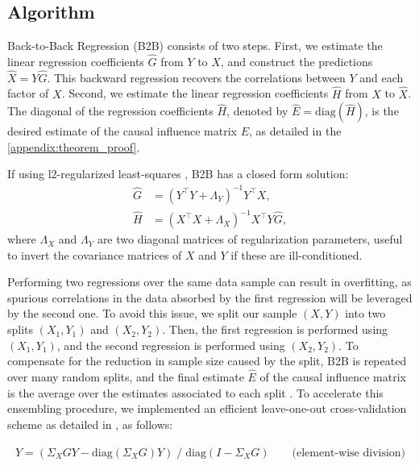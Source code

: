 \documentclass{article}
\begin{document}
\subsection{Algorithm}


Back-to-Back Regression (B2B) consists of two steps.
%
First, we estimate the linear regression coefficients $\hat G$ from $Y$ to $X$, and construct the predictions $\hat X = Y \hat G$.
%
This backward regression recovers the correlations between $Y$ and each factor of $X$.
%
Second, we estimate the linear regression coefficients $\hat H$ from $X$ to $\hat X$.
%
The diagonal of the regression coefficients $\hat H$, denoted by $\hat{E} = \text{diag}(\hat{H})$, is the desired estimate of the causal influence matrix $E$, as detailed in the \ref{appendix:theorem_proof}.

If using l2-regularized least-squares \citep{hoerl1959optimum, rifkin2007notes}, B2B has a closed form solution:
\begin{align}
    \hat G &= (Y^\top Y + \Lambda_Y)^{-1} Y^\top X,\label{eq:solG}\\
    \hat H &=(X^\top X + \Lambda_X)^{-1} X^\top Y \hat G,\label{eq:solH}
\end{align}
%
where $\Lambda_X$ and $\Lambda_Y$ are two diagonal matrices of regularization parameters, useful to invert the covariance matrices of $X$ and $Y$ if these are ill-conditioned.

Performing two regressions over the same data sample can result in overfitting, as spurious correlations in the data absorbed by the first regression will be leveraged by the second one.
%
To avoid this issue, we split our sample $(X, Y)$ into two splits $(X_1, Y_1)$ and $(X_2, Y_2)$.
%
Then, the first regression is performed using $(X_1, Y_1)$, and the second regression is performed using $(X_2, Y_2)$.
%
To compensate for the reduction in sample size caused by the split, B2B is repeated over many random splits, and the final estimate $\hat E$ of the causal influence matrix is the average over the estimates associated to each split \citep{breiman1996bagging}.
%
To accelerate this ensembling procedure, we implemented an efficient leave-one-out cross-validation scheme as detailed in \citep{rifkin2007notes} %
, as follows:
%

\begin{equation}
\hat{Y} = (\Sigma_X G Y - \text{diag}(\Sigma_X G) Y) \;/\; \text{diag}(I - \Sigma_X G) \qquad \text{(element-wise division)}
\end{equation}
\end{document}
